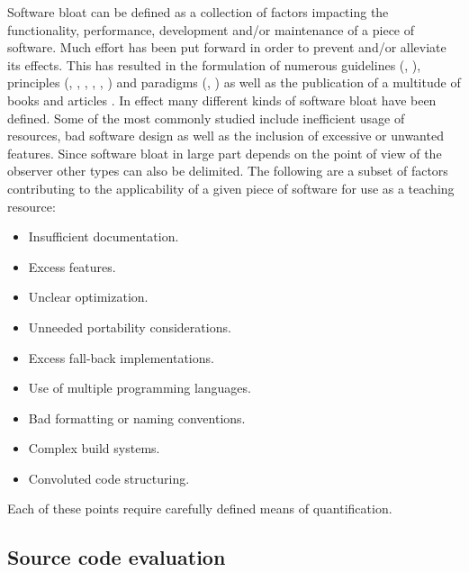 Software bloat can be defined as a collection of factors impacting the functionality, performance, development and/or maintenance of a piece of software. Much effort has been put forward in order to prevent and/or alleviate its effects. This has resulted in the formulation of numerous guidelines (\cite[C++ Core Guidelines]{cpp-guidelines}, \cite[Haskell Guidelines]{haskel-guidelines}), principles (\cite["Keep it Simple, Stupid" (KISS)]{kiss}, \cite[The Unix philosophy]{unix-philosophy}, \cite["Worse is better"]{worse-is-better}, \cite["Don't Repeat Yourself" (DRY)]{dry}, \cite["You aren't gonna need it" (YAGNI)]{yagni}, \cite[SOLID]{solid}) and paradigms (\cite[Imperative programming]{imperative}, \cite[Declarative programming]{declarative}) as well as the publication of a multitude of books \cite{clean-code,clean-architecture,pragmatic-programmer,extreme-programming,unix-programming} and articles \cite{Pike2007ProgramDI,Milicchio2007TheUK,Thayer2004FourUP,McGrenere2000AreWA,Quach2018DebloatingST,McGrenere2000BloatTO,Quach2019BloatFA}. In effect many different kinds of software bloat have been defined. Some of the most commonly studied include inefficient usage of resources, bad software design as well as the inclusion of excessive or unwanted features. Since software bloat in large part depends on the point of view of the observer other types can also be delimited. The following are a subset of factors contributing to the applicability of a given piece of software for use as a teaching resource:

\begin{itemize}
    \item Insufficient documentation.
    \item Excess features.
    \item Unclear optimization.
    \item Unneeded portability considerations.
    \item Excess fall-back implementations.
    \item Use of multiple programming languages.
    \item Bad formatting or naming conventions.
    \item Complex build systems.
    \item Convoluted code structuring.
\end{itemize}

Each of these points require carefully defined means of quantification.

\subsection{Source code evaluation}

